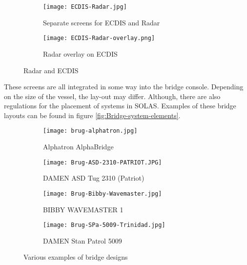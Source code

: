 \begin{figure}[p]
	\centering
	
	\begin{subfigure}[b]{0.6\textwidth}
		\texttt{[image: ECDIS-Radar.jpg]}
		\caption{Separate screens for ECDIS and Radar}
	\end{subfigure}
	\hfill
	\begin{subfigure}[b]{0.37\textwidth}
		\texttt{[image: ECDIS-Radar-overlay.png]}
		\caption{Radar overlay on ECDIS}
	\end{subfigure}
	
	\caption{Radar and ECDIS}
	\label{fig:ECDIS-example}
	
\end{figure}

These screens are all integrated in some way into the bridge console. Depending on the size of the vessel, the lay-out may differ. Although, there are also regulations for the placement of systems in \ac{SOLAS}. Examples of these bridge layouts can be found in figure \ref{fig:Bridge-system-elements}.

\begin{figure}[p]
	\centering
	
	\begin{subfigure}[b]{0.45\textwidth}
		\texttt{[image: brug-alphatron.jpg]}
		\caption{Alphatron AlphaBridge}
	\end{subfigure}
	\hfill
	\begin{subfigure}[b]{0.45\textwidth}
		\texttt{[image: Brug-ASD-2310-PATRIOT.JPG]}
		\caption{DAMEN ASD Tug 2310 (Patriot)}
	\end{subfigure}
	\hfill
	\begin{subfigure}[b]{0.45\textwidth}
		\texttt{[image: Brug-Bibby-Wavemaster.jpg]}
		\caption{BIBBY WAVEMASTER 1}
	\end{subfigure}
	\hfill
	\begin{subfigure}[b]{0.45\textwidth}
		\texttt{[image: Brug-SPa-5009-Trinidad.jpg]}
		\caption{DAMEN Stan Patrol 5009}
	\end{subfigure}	
	
	\caption{Various examples of bridge designs}
	\label{fig:bridge-example}
	
\end{figure}


